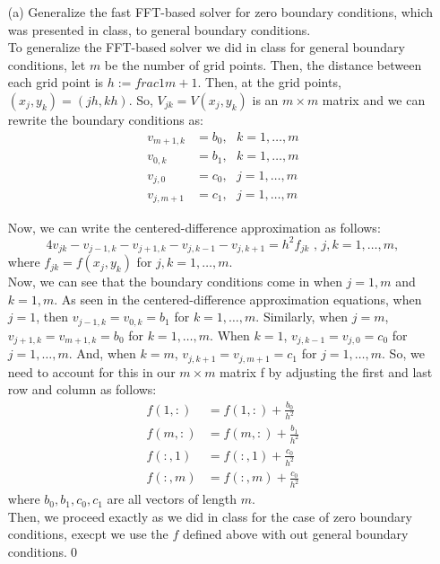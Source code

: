 \documentclass[12pt]{article}
\begin{document}
\begin{itemize}
\item[(a)] Generalize the fast FFT-based solver for zero boundary conditions, which was presented in class, to general boundary conditions.\\

To generalize the FFT-based solver we did in class for general boundary conditions, let $m$ be the number of grid points.  Then, the distance between each grid point is $h := frac{1}{m+1}$.  Then, at the grid points, $(x_j, y_k) = (jh, kh)$.  So,  $V_{jk} = V(x_j,y_k)$ is an $m\times m$ matrix and we can rewrite the boundary conditions as: 
\begin{align}
v_{m+1,k} &= b_0, \text{ } k=1,\dots , m \nonumber \\
v_{0,k} &= b_1, \text{ } k=1, \dots , m \nonumber \\
v_{j,0} &= c_0, \text{ } j=1, \dots , m \nonumber \\
v_{j,m+1} &= c_1, \text{ } j=1, \dots , m \nonumber 
\end{align}

Now, we can write the centered-difference approximation as follows:
$$4v_{jk} - v_{j-1,k} - v_{j+1,k} - v_{j,k-1} - v_{j,k+1} = h^2f_{jk} \text{ , } j,k = 1, \dots , m,$$
where $f_{jk} = f(x_j,y_k)$ for $j,k = 1, \dots , m$.\\

Now, we can see that the boundary conditions come in when $j = 1,m$ and $k=1,m$.  As seen in the centered-difference approximation equations, when $j=1$, then $v_{j-1,k} = v_{0,k} = b_1$ for $k=1, \dots,m$.  Similarly, when $j=m$, $v_{j+1,k} = v_{m+1,k} = b_0$ for $k=1, \dots,m$.  When $k=1$, $v_{j,k-1} = v_{j,0} = c_0$ for $j=1, \dots,m$.  And, when $k=m$, $v_{j,k+1} = v_{j,m+1} = c_1$ for $j=1, \dots,m$.  So, we need to account for this in our $m\times m$ matrix f by adjusting the first and last row and column as follows:
\begin{align}
f(1,:) &= f(1,:) + \frac{b_0}{h^2} \nonumber \\
f(m,:) &= f(m,:) + \frac{b_1}{h^2} \nonumber \\
f(:,1) &= f(:,1) + \frac{c_0}{h^2} \nonumber \\
f(:,m) &= f(:,m) + \frac{c_0}{h^2} \nonumber 
\end{align}
where $b_0, b_1, c_0, c_1$ are all vectors of length $m$.\\

Then, we proceed exactly as we did in class for the case of zero boundary conditions, execpt we use the $f$ defined above with out general boundary conditions.\qed\\\\




\end{itemize}
\end{document}
